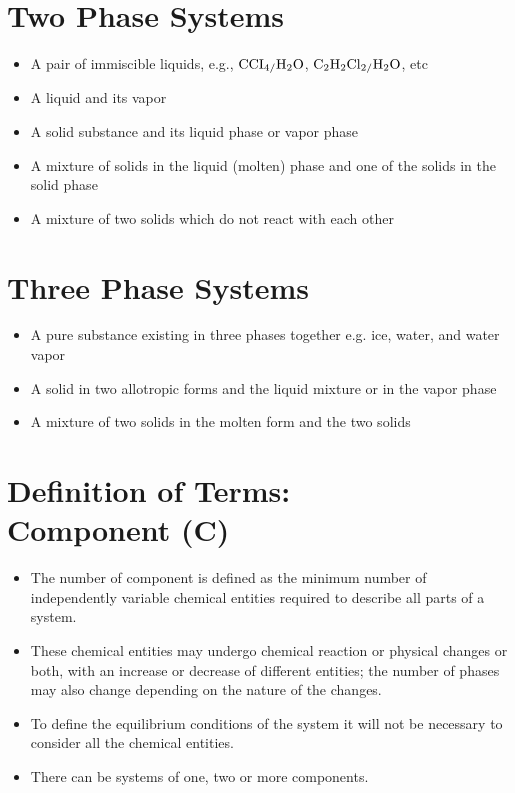 \documentclass[a4paper,12pt,twocolumn]{article}
\begin{document}
\section{Two Phase Systems}
\begin{itemize}
\item A pair of immiscible liquids, e.g., $\ce{CCI4/H2O}$, $\ce{C2H2Cl2/H2O}$, etc 
\item A liquid and its vapor 
\item A solid substance and its liquid phase or vapor phase
\item A mixture of solids in the liquid (molten) phase and one of the solids in the solid phase
\item A mixture of two solids which do not react with each other
\end{itemize}

\section{Three Phase Systems}
\begin{itemize}
\item A pure substance existing in three phases together e.g. ice, water, and water vapor 
\item A solid in two allotropic forms and the liquid mixture or in the vapor phase 
\item A mixture of two solids in the molten form and the two solids 
\end{itemize}

\section{Definition of Terms: \\ Component (C)}
\begin{itemize}
\item The number of component is defined as the minimum number of independently variable chemical entities required to describe all parts of a system. 
\item These chemical entities may undergo chemical reaction or physical changes or both, with an increase or decrease of different entities; the number of phases may also change depending on the nature of the changes. 
\item To define the equilibrium conditions of the system it will not be necessary to consider all the chemical entities.
\item There can be systems of one, two or more components. 
\end{itemize}
\end{document}
